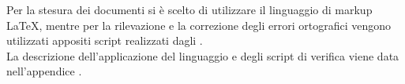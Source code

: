 		Per la stesura dei documenti si è scelto di utilizzare il linguaggio di markup \LaTeX{}, mentre per la rilevazione e la correzione degli errori ortografici vengono utilizzati appositi script realizzati dagli . \\
		La descrizione dell'applicazione del linguaggio \LaTex{} e degli script di verifica viene data nell'appendice .
